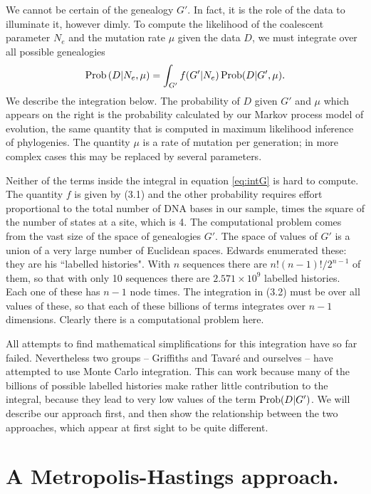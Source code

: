 We cannot be certain of the genealogy $G'$.  In fact, it is the role of
the data to illuminate it, however dimly.  To compute the likelihood of the
coalescent parameter $N_e$ and the mutation rate $\mu$ given the data $D$,
we must integrate over all possible genealogies \cite{Fels88, Fels92}
\begin{equation} %
\Prob\left(D|N_e, \mu\right) = \int_{G'} f(G'|N_e) \Prob(D|G', \mu).
\label{eq:intG}
\end{equation}
We describe the integration below.
The probability of $D$ given $G'$ and $\mu$ which appears on the right is the
probability calculated by our Markov process model of evolution, the same
quantity that is computed in maximum likelihood inference of phylogenies.
The quantity $\mu$ is a rate of mutation per generation; in more complex
cases this may be replaced by several parameters.

Neither of the terms inside the integral in equation \ref{eq:intG} is hard to compute.
The quantity $f$ is given by (3.1) and the other probability requires
effort proportional to the total number of DNA bases in our sample, times
the square of the number of states at a site, which is 4.  The computational
problem comes from the vast size of the space of genealogies $G'$.  The space
of values of $G'$ is a union of a very large number of Euclidean spaces.
Edwards \cite{Edwards70} enumerated these: they are his ``labelled histories".
With $n$ sequences there are $n!(n-1)!/2^{n-1}$ of them, so that with only
10 sequences there are $2.571\times 10^9$ labelled histories.  Each
one of these has $n-1$ node times.  The integration in (3.2) must be over
all values of these, so that each of these billions of terms integrates over
$n-1$ dimensions.  Clearly there is a computational problem here.

All attempts to find mathematical simplifications for this integration
have so far failed.  Nevertheless two groups -- Griffiths and Tavar\'e and
ourselves -- have attempted to use Monte Carlo integration.  This can work
because many of the billions of possible labelled histories make rather
little contribution to the integral, because they lead to very low values of the
term $\mathop{\rm Prob}\nolimits(D|G')$.  We will describe our approach first, and then show the
relationship between the two approaches, which appear at first sight to be
quite different.

\section{A Metropolis-Hastings approach.}

